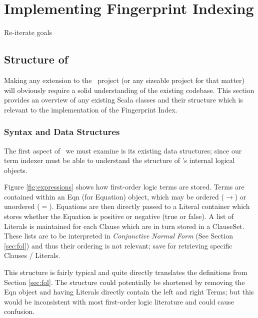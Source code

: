 
\chapter{Implementing Fingerprint Indexing}
\label{cha:method}

Re-iterate goals

\section{Structure of \Beagle}
\label{sec:initial}

Making any extension to the \beagle\ project (or any sizeable project
for that matter) will obviously require a solid
understanding of the existing codebase. This section provides an overview
of any existing Scala classes and their structure which is relevant to the implementation of the Fingerprint Index.

\subsection{Syntax and Data Structures}

The first aspect of \beagle\ we must examine is its existing data structures;
since our term indexer must be able to understand the structure of \beagle's internal
logical objects.

Figure \ref{fig:expressions} shows how first-order logic terms are stored. Terms
are contained within an Eqn (for Equation) object, which may be ordered ($\to$)
or unordered ($=$). Equations are then directly passed to a Literal container
which stores whether the Equation is positive or negative (true or false). A list
of Literals is maintained for each Clause which are in turn stored in a ClauseSet.
These lists are to be interpreted in \emph{Conjunctive Normal Form} (See Section \ref{sec:fol})
and thus their ordering is not relevant; save for retrieving specific Clauses / Literals.

This structure is fairly typical and quite directly translates the definitions
from Section \ref{sec:fol}. The structure could potentially be shortened by
removing the Eqn object and having Literals directly contain the left and right Terms;
but this would be inconsistent with most first-order logic literature and could cause confusion.

